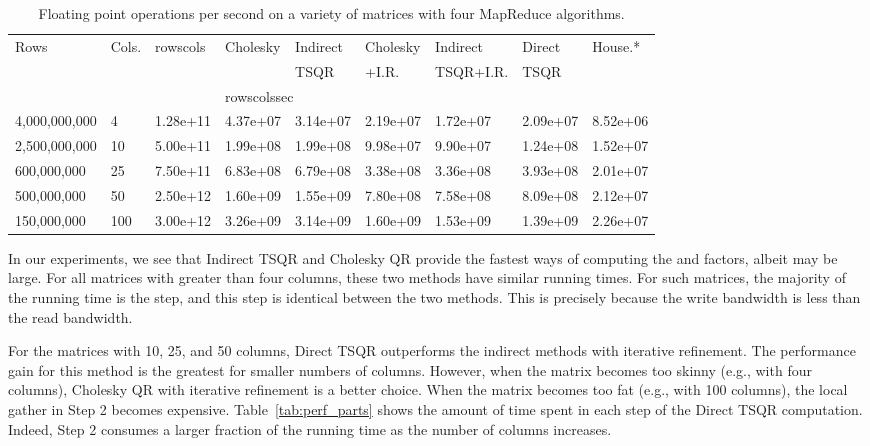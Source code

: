 \documentclass[10pt, conference, compsocconf]{IEEEtran}
\begin{document}
\begin{table*}[tbp]
\vspace{-\baselineskip}
\centering
\caption{Floating point operations per second on a variety of matrices with four MapReduce algorithms.}
\begin{tabularx}{\linewidth}{llXXXXXXX}
\toprule
Rows & Cols. & rowscols & Cholesky & Indirect & Cholesky & Indirect       & Direct & House.*\\
           &           &                                                  &                   & TSQR    & +I.R.         & TSQR+I.R. & TSQR & \\ \cmidrule{4-9}
& & & \multicolumn{2}{l}{rowscolssec} \\ \midrule
4,000,000,000 & 4     & 1.28e+11 &  4.37e+07 &   3.14e+07 & 2.19e+07 &  1.72e+07  & 2.09e+07 &  8.52e+06\\
2,500,000,000 & 10   & 5.00e+11 &  1.99e+08 &  1.99e+08  & 9.98e+07  & 9.90e+07   & 1.24e+08 & 1.52e+07\\
600,000,000    & 25   & 7.50e+11 &  6.83e+08 &  6.79e+08  & 3.38e+08  & 3.36e+08   & 3.93e+08 & 2.01e+07\\
500,000,000    & 50   & 2.50e+12 &  1.60e+09 &  1.55e+09  & 7.80e+08  & 7.58e+08   & 8.09e+08 & 2.12e+07\\
150,000,000    & 100 & 3.00e+12 &  3.26e+09 &  3.14e+09  & 1.60e+09  & 1.53e+09  & 1.39e+09 & 2.26e+07\\
\bottomrule
\end{tabularx}
\label{tab:work_performance}
\end{table*}

In our experiments, we see that Indirect TSQR and Cholesky QR provide the fastest ways of computing the  and  factors, albeit  may be large.  For all matrices with greater than four columns, these two methods have similar running times.  For such matrices, the majority of the running time is the  step, and this step is identical between the two methods.  This is precisely because the write bandwidth is less than the read bandwidth.

For the matrices with 10, 25, and 50 columns, Direct TSQR outperforms the indirect methods with iterative refinement.  The performance gain for this method is the greatest for smaller numbers of columns.  However, when the matrix becomes too skinny (e.g., with four columns), Cholesky QR with iterative refinement is a better choice.  When the matrix becomes too fat (e.g., with 100 columns), the local gather in Step 2 becomes expensive.  Table~\ref{tab:perf_parts} shows the amount of time spent in each step of the Direct TSQR computation.  Indeed, Step 2 consumes a larger fraction of the running time as the number of columns increases.
\end{document}
